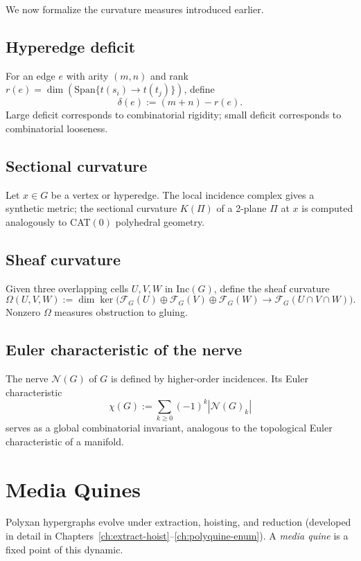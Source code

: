 We now formalize the curvature measures introduced earlier.

\subsection{Hyperedge deficit}

For an edge $e$ with arity $(m,n)$ and rank 
$r(e)=\dim(\mathrm{Span}\{t(s_i)\to t(t_j)\})$,
define
\[
\delta(e) := (m+n) - r(e).
\]
Large deficit corresponds to combinatorial rigidity; small deficit corresponds
to combinatorial looseness.

\subsection{Sectional curvature}

Let $x\in G$ be a vertex or hyperedge.  
The local incidence complex gives a synthetic metric; the sectional curvature
$K(\Pi)$ of a 2-plane $\Pi$ at $x$ is computed analogously to CAT$(0)$
polyhedral geometry.

\subsection{Sheaf curvature}

Given three overlapping cells $U,V,W$ in $\mathrm{Inc}(G)$, define the sheaf curvature
\[
\Omega(U,V,W)
:= \dim \ker\!\big(
    \mathscr{F}_G(U)\oplus \mathscr{F}_G(V)\oplus \mathscr{F}_G(W)
    \to
    \mathscr{F}_G(U\cap V\cap W)
  \big).
\]
Nonzero $\Omega$ measures obstruction to gluing.

\subsection{Euler characteristic of the nerve}

The nerve $\mathcal{N}(G)$ of $G$ is defined by higher-order incidences.
Its Euler characteristic
\[
\chi(G) := \sum_{k\ge 0} (-1)^k |\mathcal{N}(G)_k|
\]
serves as a global combinatorial invariant, analogous to the topological Euler
characteristic of a manifold.

\section{Media Quines}

Polyxan hypergraphs evolve under extraction, hoisting, and reduction (developed
in detail in Chapters~\ref{ch:extract-hoist}--\ref{ch:polyquine-enum}).
A \emph{media quine} is a fixed point of this dynamic.

